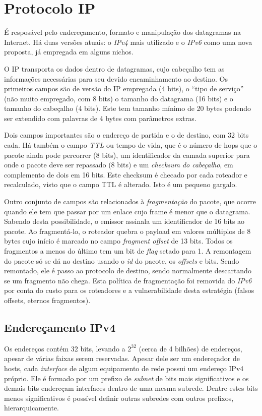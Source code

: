 \section{Protocolo IP}

É resposável pelo endereçamento, formato e manipulação dos datagramas na Internet.
Há duas versões atuais: o \emph{IPv4} mais utilizado e o \emph{IPv6} como uma nova proposta, já empregada em alguns nichos.

O IP transporta os dados dentro de datagramas, cujo cabeçalho tem as informações necessárias para seu devido encaminhamento ao destino.
Os primeiros campos são de versão do IP empregada (4 bits), o ``tipo de serviço'' (não muito empregado, com 8 bits) o tamanho do datagrama (16 bits) e o tamanho do cabeçalho (4 bits).
Este tem tamanho mínimo de 20 bytes podendo ser extendido com palavras de 4 bytes com parâmetros extras.

Dois campos importantes são o endereço de partida e o de destino, com 32 bits cada.
Há também o campo \emph{TTL} ou tempo de vida, que é o número de hops que o pacote ainda pode percorrer (8 bits), um identificador da camada superior para onde o pacote deve ser repassado (8 bits) e um \emph{checksum do cabeçalho}, em complemento de dois em 16 bits.
Este checksum é checado por cada roteador e recalculado, visto que o campo TTL é alterado. Isto é um pequeno gargalo.

Outro conjunto de campos são relacionados à \emph{fragmentação} do pacote, que ocorre quando ele tem que passar por um enlace cujo frame é menor que o datagrama.
Sabendo desta possibilidade, o emissor assinala um identificador de 16 bits ao pacote. 
Ao fragmentá-lo, o roteador quebra o payload em valores múltiplos de 8 bytes cujo início é marcado no campo \emph{fragment offset} de 13 bits.
Todos os fragmentos a menos do último tem um bit de \emph{flag} setado para 1.
A remontagem do pacote só se dá no destino usando o \emph{id} do pacote, os \emph{offsets} e bits.
Sendo remontado, ele é passo ao protocolo de destino, sendo normalmente descartando se um fragmento não chega.
Esta política de fragmentação foi removida do \emph{IPv6} por conta do custo para os roteadores e a vulnerabilidade desta estratégia (falsos offsets, eternos fragmentos).

\subsection{Endereçamento IPv4}

Os endereços contém 32 bits, levando a $2^{32}$ (cerca de 4 bilhões) de endereços, apesar de várias faixas serem reservadas.
Apesar dele ser um endereçador de hosts, cada \emph{interface} de algum equipamento de rede possui um endereço IPv4 próprio.
Ele é formado por um prefixo de \emph{subnet} de bits mais significativos e os demais bits endereçam interfaces dentro de uma mesma subrede.
Dentre estes bits menos significativos é possível definir outras subredes com outros prefixos, hierarquicamente.

